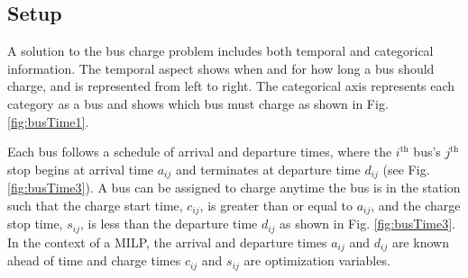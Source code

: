 \subsection{Setup}
\par A solution to the bus charge problem includes both temporal and categorical information. The temporal aspect shows when and for how long a bus should charge, and is represented from left to right. The categorical axis represents each category as a bus and shows which bus must charge as shown in Fig. \ref{fig:busTime1}.

\par Each bus follows a schedule of arrival and departure times, where the $i^{\text{th}}$ bus's $j^{\text{th}}$ stop begins at arrival time $a_{ij}$ and terminates at departure time $d_{ij}$ (see Fig. \ref{fig:busTime3}).  A bus can be assigned to charge anytime the bus is in the station such that the charge start time, $c_{ij}$, is greater than or equal to $a_{ij}$, and the charge stop time, $s_{ij}$, is less than the departure time $d_{ij}$ as shown in Fig. \ref{fig:busTime3}. In the context of a MILP, the arrival and departure times $a_{ij}$ and $d_{ij}$ are known ahead of time and charge times $c_{ij}$ and $s_{ij}$ are optimization variables. 

